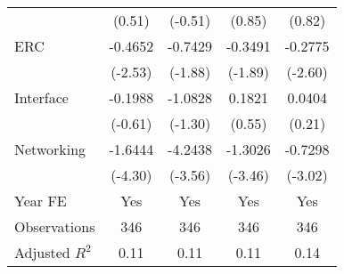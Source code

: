 {\begin{tabular}{l*{4}{c}}
                                   &      (0.51)         &     (-0.51)         &      (0.85)         &      (0.82)         \\
[1em]
ERC                                &     -0.4652\sym{**} &     -0.7429\sym{*}  &     -0.3491\sym{*}  &     -0.2775\sym{***}\\
                                   &     (-2.53)         &     (-1.88)         &     (-1.89)         &     (-2.60)         \\
[1em]
Interface                          &     -0.1988         &     -1.0828         &      0.1821         &      0.0404         \\
                                   &     (-0.61)         &     (-1.30)         &      (0.55)         &      (0.21)         \\
[1em]
Networking                         &     -1.6444\sym{***}&     -4.2438\sym{***}&     -1.3026\sym{***}&     -0.7298\sym{***}\\
                                   &     (-4.30)         &     (-3.56)         &     (-3.46)         &     (-3.02)         \\
[1em]
Year FE                            &         Yes         &         Yes         &         Yes         &         Yes         \\
\hline
Observations                       &         346         &         346         &         346         &         346         \\
Adjusted \(R^{2}\)                 &        0.11         &        0.11         &        0.11         &        0.14         \\
\hline\hline
\end{tabular}
}
